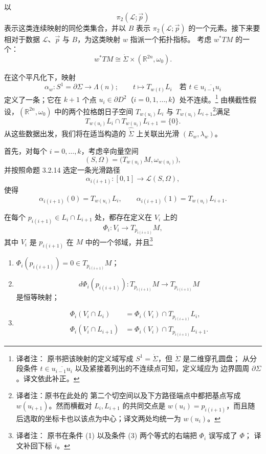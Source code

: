 以
\[
  \pi_2(\mathcal L;\vec p)
\]
表示这类连续映射的同伦类集合，并以 $B$ 表示
$\pi_2(\mathcal L;\vec p)$ 的一个元素。接下来要相对于数据
$\mathcal L$、$\vec p$ 与 $B$，为这类映射 $w$ 指派一个拓扑指标。
考虑 $w^*TM$ 的一个\termSymplecticTrivialization{}：
\[
  w^*TM\cong
  \dot\Sigma\times(\mathbb R^{2n},\omega_0).
\]

在这个平凡化下，映射
\[
  \alpha_w:S^1=\partial\Sigma\longrightarrow\Lambda(n);
  \qquad
  t\longmapsto T_{w(t)}L_i
  \quad\text{若 }t\in\overline{u_{i-1}u_i}
\]
定义了一条\termPiecewiseSmoothPath{}；它在 $k+1$ 个点
$u_i\in\partial D^2$（$i=0,1,\ldots,k$）处不连续。\footnote{译者注：
原书把该映射的定义域写成 $S^1=\dot\Sigma$，但 $\dot\Sigma$ 是二维穿孔圆盘；
从分段条件 $t\in\overline{u_{i-1}u_i}$ 以及紧接着列出的不连续点可知，定义域应为
边界圆周 $\partial\Sigma$。译文依此补正。}
由横截性假设，$(\mathbb R^{2n},\omega_0)$ 中的两个拉格朗日子空间
$T_{w(u_i)}L_i$ 与 $T_{w(u_i)}L_{i+1}$\footnote{译者注：原书在此处的
第二个切空间以及下方路径端点中都把基点写成 $w(u_{i+1})$。然而横截对
$L_i,L_{i+1}$ 的共同交点是 $w(u_i)=p_{i(i+1)}$，而且随后选取的\personDarboux{}坐标卡也以该点为中心；译文两处均统一为 $w(u_i)$。}满足
\[
  T_{w(u_i)}L_i\cap T_{w(u_i)}L_{i+1}=\{0\}.
\]
从这些数据出发，我们将在适当构造的\termBorderedRiemannSurface{}
$\widehat{\dot\Sigma}$ 上关联出光滑\termSymplecticBundlePair{}
$(E_w,\lambda_w)$。

首先，对每个 $i=0,\ldots,k$，考虑辛向量空间
\[
  (S,\Omega)=\bigl(T_{w(u_i)}M,\omega_{w(u_i)}\bigr),
\]
并按照命题 3.2.14 选定一条光滑路径
\[
  \alpha_{i(i+1)}:[0,1]\longrightarrow\mathcal L(S,\Omega),
\]
使得
\[
  \alpha_{i(i+1)}(0)=T_{w(u_i)}L_i,
  \qquad
  \alpha_{i(i+1)}(1)=T_{w(u_i)}L_{i+1}.
\]

在每个 $p_{i(i+1)}\in L_i\cap L_{i+1}$ 处，都存在定义在
$V_i$ 上的\termDarbouxChart{}
\[
  \Phi_i:V_i\longrightarrow T_{p_{i(i+1)}}M,
\]
其中 $V_i$ 是 $p_{i(i+1)}$ 在 $M$ 中的一个邻域，并且\footnote{译者注：
原书在条件 (1) 以及条件 (3) 两个等式的右端把 $\Phi_i$ 误写成了 $\Phi$；
译文补回下标 $i$。}
\begin{enumerate}[label=(\arabic*)]
  \item $\Phi_i(p_{i(i+1)})=0\in T_{p_{i(i+1)}}M$；
  \item
  \[
    d\Phi_i(p_{i(i+1)}):
    T_{p_{i(i+1)}}M\longrightarrow T_{p_{i(i+1)}}M
  \]
  是恒等映射；
  \item
  \[
  \begin{aligned}
    \Phi_i(V_i\cap L_i)
      &=\Phi_i(V_i)\cap T_{p_{i(i+1)}}L_i,\\
    \Phi_i(V_i\cap L_{i+1})
      &=\Phi_i(V_i)\cap T_{p_{i(i+1)}}L_{i+1}.
  \end{aligned}
  \]
\end{enumerate}

